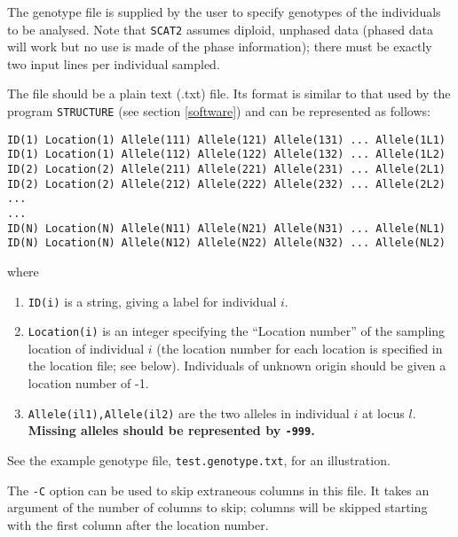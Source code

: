 \documentclass[10pt,titlepage,times,letterpaper]{article}
\def\SCAT{{\tt SCAT2} }
\begin{document}
The genotype file is supplied by the user to specify genotypes of the
individuals to be analysed.   Note that \SCAT assumes diploid, unphased
data (phased data will work but no use is made of the phase information);
there must be exactly two input lines per individual sampled.

The file should be a plain text (.txt) file.
Its format is similar to that
used by the program {\tt STRUCTURE} (see section \ref{software})
and can be represented as follows:

\begin{verbatim}
ID(1) Location(1) Allele(111) Allele(121) Allele(131) ... Allele(1L1)
ID(1) Location(1) Allele(112) Allele(122) Allele(132) ... Allele(1L2)
ID(2) Location(2) Allele(211) Allele(221) Allele(231) ... Allele(2L1)
ID(2) Location(2) Allele(212) Allele(222) Allele(232) ... Allele(2L2)
...
...
ID(N) Location(N) Allele(N11) Allele(N21) Allele(N31) ... Allele(NL1)
ID(N) Location(N) Allele(N12) Allele(N22) Allele(N32) ... Allele(NL2)
\end{verbatim}
where
\begin{enumerate}
\item{\tt ID(i)} is a string, giving a label for individual $i$.
\item{\tt Location(i)} is an integer specifying the ``Location number'' of
the sampling location
of individual $i$ (the location number for each location 
is specified in the location file; see below). Individuals of unknown
origin should be given a location number of -1.
\item{{\tt Allele(il1),Allele(il2)}} are the two alleles in
individual $i$ at locus $l$. {\bf Missing alleles should
be represented by {\tt -999}.}
\end{enumerate}
See the example genotype file, {\tt test.genotype.txt}, for an illustration.

The {\tt -C} option can be used to skip extraneous columns in this
file.  It takes an argument of the number of columns to skip;
columns will be skipped starting with the first column after the location
number.
\end{document}
